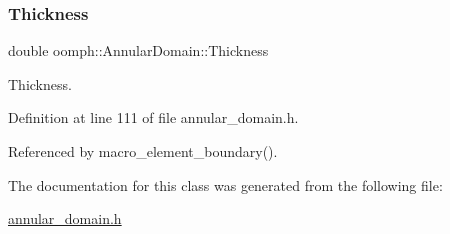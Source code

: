 \subsubsection{\texorpdfstring{Thickness}{Thickness}}
{\footnotesize\ttfamily double oomph\+::\+Annular\+Domain\+::\+Thickness\hspace{0.3cm}{\ttfamily [private]}}



Thickness. 



Definition at line 111 of file annular\+\_\+domain.\+h.



Referenced by macro\+\_\+element\+\_\+boundary().



The documentation for this class was generated from the following file\+:\begin{DoxyCompactItemize}
\item 
\hyperlink{annular__domain_8h}{annular\+\_\+domain.\+h}\end{DoxyCompactItemize}
